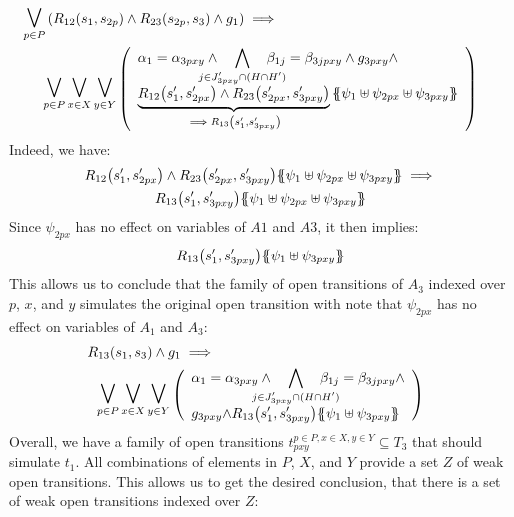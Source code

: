 \documentclass[runningheads]{llncs}
\begin{document}
\begin{enumerate}
\begin{multline*}
\operatorname*{\bigsymb{\bigvee}}_{p\in P} \mpar{R_{12}\mpar{s_1, s_{2p}} \wedge R_{23}\mpar{s_{2p},s_3} \wedge g_1} \implies 
\hspace{5.5cm}\\
\operatorname*{\bigsymb{\bigvee}}_{p\in P}
\operatorname*{\bigsymb{\bigvee}}_{x \in X} 
\operatorname*{\bigsymb{\bigvee}}_{y \in Y}
\mpar{\everymath{\displaystyle}
\begin{array}{l}
\alpha_1=\alpha_{3pxy}\wedge \bigwedge_\subbox{j \in J'_{3pxy} \cap (H\cap H')} \beta_{1j}=\beta_{3jpxy} \wedge g_{3pxy}\wedge \\
\underbrace{R_{12}\mpar{s'_1, s'_{2px}} \wedge R_{23}\mpar{s'_{2px}, s'_{3pxy}}}_{\implies R_{13}\mpar{s'_1,s'_{3pxy}}}\psubst{\psi_1 \uplus \psi_{2px} \uplus \psi_{3pxy}}
\end{array}}
\end{multline*}
Indeed, we have:
\begin{multline*}
R_{12}\mpar{s'_1, s'_{2px}} \wedge R_{23}\mpar{s'_{2px}, s'_{3pxy}}\psubst{\psi_1 \uplus \psi_{2px} \uplus \psi_{3pxy}} \implies\\ R_{13}\mpar{s'_1,s'_{3pxy}}
\psubst{\psi_1 \uplus \psi_{2px} \uplus \psi_{3pxy}}
\end{multline*}
Since $\psi_{2px}$ has no effect on variables of $A1$ and $A3$, it then implies:
\begin{align*}
R_{13}{\left(s'_1,s'_{3pxy}\right)}{\left\{\!\!{\left\{\psi_1  \uplus \psi_{3pxy}\right\}}\!\!\right\}}
\end{align*}
This allows us to conclude that the family of open transitions of $A_3$ indexed over $p$, $x$,  and $y$ simulates the original open transition  with note that $\psi_{2px}$ has no effect on variables of $A_1$ and $A_3$:
\begin{multline*}
R_{13}(s_1,s_3)  \wedge g_1 \implies 
\hspace{5.5cm}\\
\operatorname*{\bigsymb{\bigvee}}_{p\in P}
\operatorname*{\bigsymb{\bigvee}}_{x \in X} 
\operatorname*{\bigsymb{\bigvee}}_{y \in Y}
\mpar{\everymath{\displaystyle}
\begin{array}{l}
\alpha_1=\alpha_{3pxy}\wedge \bigwedge_\subbox{j \in J'_{3pxy} \cap (H\cap H')} \beta_{1j}=\beta_{3jpxy} \wedge\\ g_{3pxy} 
{\wedge R_{13}\mpar{s'_1,s'_{3pxy}}}\psubst{\psi_1  \uplus \psi_{3pxy}}
\end{array}}
\end{multline*}
Overall, we have a family of open transitions $t^{p\in P,x\in X,y\in Y}_{pxy} \subseteq T_3$ that should simulate $t_1$. All  combinations of elements in $P$, $X$, and $Y$ provide a set $Z$ of weak open transitions.  This allows us to get the desired conclusion, that there is a set of weak open transitions indexed over $Z$:\\

\end{enumerate}
\end{document}
